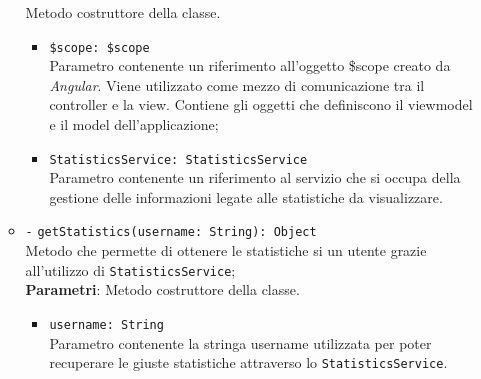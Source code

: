 \begin{itemize}
\begin{itemize}
		Metodo costruttore della classe. \\
		\begin{itemize}
			\item \texttt{\$scope: \$scope} \\
			Parametro contenente un riferimento all’oggetto \$scope creato da \textit{Angular}. Viene utilizzato come mezzo di comunicazione tra il controller e la view. Contiene gli oggetti che definiscono il viewmodel e il model dell’applicazione;
			\item \texttt{StatisticsService: StatisticsService} \\
			Parametro contenente un riferimento al servizio che si occupa della gestione delle informazioni legate alle statistiche da visualizzare.
		\end{itemize}
		\item \texttt{-} \texttt{getStatistics(username: String): Object} \\ 
		Metodo che permette di ottenere le statistiche si un utente grazie all'utilizzo di \texttt{StatisticsService}; \\
		\textbf{Parametri}: 
		Metodo costruttore della classe. \\
		\begin{itemize}
			\item \texttt{username: String} \\
			Parametro contenente la stringa username utilizzata per poter recuperare le giuste statistiche attraverso lo \texttt{StatisticsService}.
		\end{itemize}
	\end{itemize}
\end{itemize}

